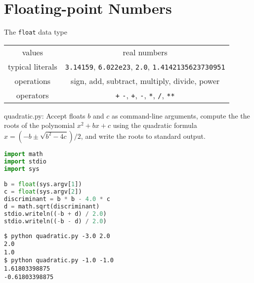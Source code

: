 \documentclass[8pt,a4paper,compress]{beamer}
\begin{document}
\section{Floating-point Numbers}
\begin{frame}[fragile]
The \lstinline{float} data type
\begin{center}
\begin{tabular}{c|c}
values & real numbers \\
typical literals & \lstinline$3.14159$, \lstinline$6.022e23$, \lstinline$2.0$, \lstinline$1.4142135623730951$ \\ 
operations & sign, add, subtract, multiply, divide, power \\
operators & \lstinline$+$ \lstinline$-$, \lstinline$+$, \lstinline$-$, \lstinline$*$, \lstinline$/$, \lstinline$**$
\end{tabular} 
\end{center}

\begin{framed}
\tiny quadratic.py: Accept floats $b$ and $c$ as command-line arguments, compute the the roots of the polynomial $x^2 + bx + c$ using the quadratic formula $x=(-b\pm \sqrt{b^2-4c})/2$, and write the roots to standard output.
\end{framed}

\begin{lstlisting}[language=Python]
import math
import stdio
import sys

b = float(sys.argv[1])
c = float(sys.argv[2])
discriminant = b * b - 4.0 * c
d = math.sqrt(discriminant)
stdio.writeln((-b + d) / 2.0)
stdio.writeln((-b - d) / 2.0)
\end{lstlisting}

\begin{lstlisting}[language={}]
$ python quadratic.py -3.0 2.0
2.0
1.0
$ python quadratic.py -1.0 -1.0
1.61803398875
-0.61803398875
\end{lstlisting}
\end{frame}
\end{document}
